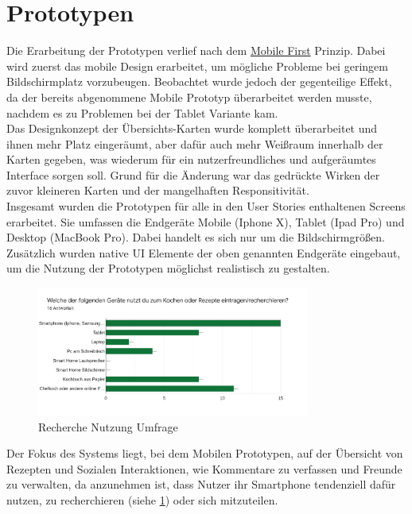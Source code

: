 \section{Prototypen}
Die Erarbeitung der Prototypen verlief nach dem \href{https://de.ryte.com/wiki/Mobile_First#Das_Prinzip}{Mobile First} \citep{mobilefirst:online} Prinzip. Dabei wird zuerst das mobile Design erarbeitet, um mögliche Probleme bei geringem Bildschirmplatz vorzubeugen. Beobachtet wurde jedoch der gegenteilige Effekt, da der bereits abgenommene Mobile Prototyp überarbeitet werden musste, nachdem es zu Problemen bei der Tablet Variante kam. \\ 

Das Designkonzept der Übersichts-Karten wurde komplett überarbeitet und ihnen mehr Platz eingeräumt, aber dafür auch mehr Weißraum \citep[vgl. Abschnitt {``Das Prinzip''}]{hegdewhitespace:online} innerhalb der Karten gegeben, was wiederum für ein nutzerfreundliches und aufgeräumtes Interface sorgen soll. Grund für die Änderung war das gedrückte Wirken der zuvor kleineren Karten und der mangelhaften Responsitivität. \\

Insgesamt wurden die Prototypen für alle in den User Stories enthaltenen Screens erarbeitet. Sie umfassen die Endgeräte Mobile (Iphone X), Tablet (Ipad Pro) und Desktop (MacBook Pro). Dabei handelt es sich nur um die Bildschirmgrößen. Zusätzlich wurden native UI Elemente der oben genannten Endgeräte eingebaut, um die Nutzung der Prototypen möglichst realistisch zu gestalten. \\

\begin{figure}[h] %
    \center
    \includegraphics[width=0.8\textwidth]{images/recherchenutzung.png}
    \caption[Umfrage zur Nutzung der Geräte für die Recherche]{Recherche Nutzung Umfrage}
    \label{fig:recherchenutzung}
\end{figure}
Der Fokus des Systems liegt, bei dem Mobilen Prototypen, auf der Übersicht von Rezepten und Sozialen Interaktionen, wie Kommentare zu verfassen und Freunde zu verwalten, da anzunehmen ist, dass Nutzer ihr Smartphone tendenziell dafür nutzen, zu recherchieren (siehe \ref{fig:recherchenutzung}) oder sich mitzuteilen. \\

